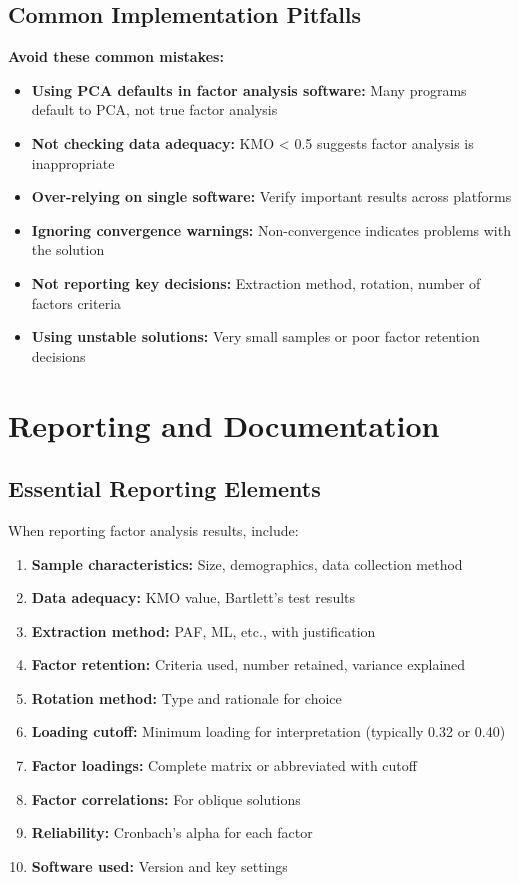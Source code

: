 \documentclass[a4paper]{tufte-book}
\begin{document}
\subsection{Common Implementation Pitfalls}

\begin{commonmistake}
\textbf{Avoid these common mistakes:}
\begin{itemize}
\item \textbf{Using PCA defaults in factor analysis software:} Many programs default to PCA, not true factor analysis
\item \textbf{Not checking data adequacy:} KMO < 0.5 suggests factor analysis is inappropriate
\item \textbf{Over-relying on single software:} Verify important results across platforms
\item \textbf{Ignoring convergence warnings:} Non-convergence indicates problems with the solution
\item \textbf{Not reporting key decisions:} Extraction method, rotation, number of factors criteria
\item \textbf{Using unstable solutions:} Very small samples or poor factor retention decisions
\end{itemize}
\end{commonmistake}

\section{Reporting and Documentation}

\subsection{Essential Reporting Elements}

When reporting factor analysis results, include:

\begin{enumerate}
\item \textbf{Sample characteristics:} Size, demographics, data collection method
\item \textbf{Data adequacy:} KMO value, Bartlett's test results  
\item \textbf{Extraction method:} PAF, ML, etc., with justification
\item \textbf{Factor retention:} Criteria used, number retained, variance explained
\item \textbf{Rotation method:} Type and rationale for choice
\item \textbf{Loading cutoff:} Minimum loading for interpretation (typically 0.32 or 0.40)
\item \textbf{Factor loadings:} Complete matrix or abbreviated with cutoff
\item \textbf{Factor correlations:} For oblique solutions
\item \textbf{Reliability:} Cronbach's alpha for each factor
\item \textbf{Software used:} Version and key settings
\end{enumerate}
\end{document}
